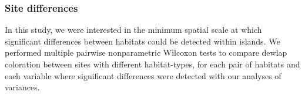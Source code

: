\subsubsection*{Site differences}

In this study, we were interested in the minimum spatial scale at which significant differences between habitats could be detected within islands. We performed multiple pairwise nonparametric Wilcoxon tests to compare dewlap coloration between sites with different habitat-types, for each pair of habitats and each variable where significant differences were detected with our analyses of variances.